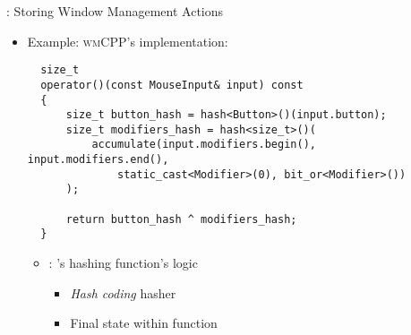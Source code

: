 \begin{frame}[fragile]{\underline{\cpp}: Storing Window Management Actions \hfill {\footnotesize \currentname}}


    \begin{itemize}

        \item Example: \textsc{wmCPP}'s  implementation:\\[3pt] 
\begin{verbatim}
  size_t
  operator()(const MouseInput& input) const
  {
      size_t button_hash = hash<Button>()(input.button);
      size_t modifiers_hash = hash<size_t>()(
          accumulate(input.modifiers.begin(), input.modifiers.end(),
              static_cast<Modifier>(0), bit_or<Modifier>())
      );

      return button_hash ^ modifiers_hash;
  }
\end{verbatim}

    \vspace*{5pt}\begin{itemize}

        \item {}: 's hashing function's logic
            \begin{itemize}
                \item \textit{Hash coding} hasher
                \item Final state within function
            \end{itemize}

    \end{itemize}

    \end{itemize}

    \vfill

\end{frame}

